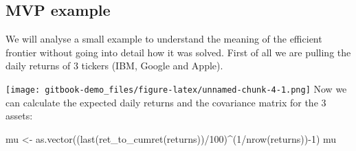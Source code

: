\documentclass[
  oneside]{book}
\newenvironment{Shaded}{\begin{snugshade}}{\end{snugshade}}
\newcommand{\AttributeTok}[1]{\textcolor[rgb]{0.77,0.63,0.00}{#1}}
\newcommand{\DecValTok}[1]{\textcolor[rgb]{0.00,0.00,0.81}{#1}}
\newcommand{\FunctionTok}[1]{\textcolor[rgb]{0.00,0.00,0.00}{#1}}
\newcommand{\NormalTok}[1]{#1}
\newcommand{\OtherTok}[1]{\textcolor[rgb]{0.56,0.35,0.01}{#1}}
\newcommand{\SpecialCharTok}[1]{\textcolor[rgb]{0.00,0.00,0.00}{#1}}
\newcommand{\StringTok}[1]{\textcolor[rgb]{0.31,0.60,0.02}{#1}}
\begin{document}
\hypertarget{mvp-example}{%
\subsection{MVP example}\label{mvp-example}}

We will analyse a small example to understand the meaning of the efficient frontier without going into detail how it was solved. First of all we are pulling the daily returns of 3 tickers (IBM, Google and Apple).

\begin{Shaded}
\end{Shaded}

\texttt{[image: gitbook-demo\_files/figure-latex/unnamed-chunk-4-1.png]}
Now we can calculate the expected daily returns and the covariance matrix for the 3 assets:

\begin{Shaded}
\begin{Highlighting}[]
\NormalTok{mu }\OtherTok{\textless{}{-}} \FunctionTok{as.vector}\NormalTok{((}\FunctionTok{last}\NormalTok{(}\FunctionTok{ret\_to\_cumret}\NormalTok{(returns))}\SpecialCharTok{/}\DecValTok{100}\NormalTok{)}\SpecialCharTok{\^{}}\NormalTok{(}\DecValTok{1}\SpecialCharTok{/}\FunctionTok{nrow}\NormalTok{(returns))}\SpecialCharTok{{-}}\DecValTok{1}\NormalTok{)}
\NormalTok{mu}
\end{Highlighting}
\end{Shaded}
\end{document}
